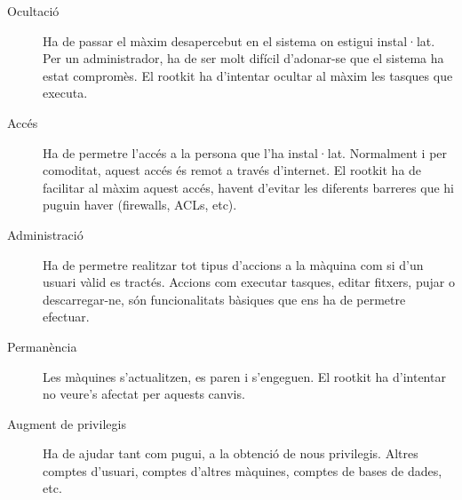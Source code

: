 \begin{description}
    \item[Ocultació] Ha de passar el màxim desapercebut en el sistema on estigui
    instal·lat. Per un administrador, ha de ser molt difícil d'adonar-se que el
    sistema ha estat compromès. El rootkit ha d'intentar ocultar al màxim les tasques
    que executa.

    \item[Accés] Ha de permetre l'accés a la persona que
    l'ha instal·lat. Normalment i per comoditat, aquest accés és remot a través
    d'internet. El rootkit ha de facilitar al màxim aquest accés, havent d'evitar les diferents 
    barreres que hi puguin haver (firewalls, ACLs, etc).

    \item[Administració] Ha de permetre realitzar tot tipus
    d'accions a la màquina com si d'un usuari vàlid es tractés. Accions com executar
    tasques, editar fitxers, pujar o descarregar-ne, són funcionalitats bàsiques que ens
    ha de permetre efectuar.

    \item[Permanència] Les màquines s'actualitzen, es paren i s'engeguen. El rootkit ha
    d'intentar no veure's afectat per aquests canvis.

    \item[Augment de privilegis] Ha de ajudar tant com pugui, a la obtenció de nous
    privilegis. Altres comptes d'usuari, comptes d'altres màquines, comptes de bases de dades, etc.
\end{description}

